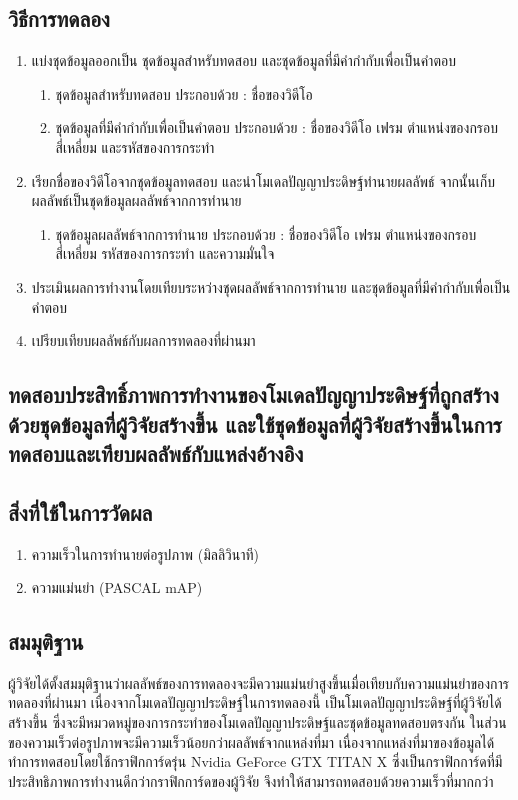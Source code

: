 \subsection*{วิธีการทดลอง}
	\begin{enumerate}
		\item แบ่งชุดข้อมูลออกเป็น ชุดข้อมูลสำหรับทดสอบ และชุดข้อมูลที่มีคำกำกับเพื่อเป็นคำตอบ
			\begin{enumerate}
				\item ชุดข้อมูลสำหรับทดสอบ ประกอบด้วย : ชื่อของวิดีโอ
				\item ชุดข้อมูลที่มีคำกำกับเพื่อเป็นคำตอบ ประกอบด้วย : ชื่อของวิดีโอ เฟรม ตำแหน่งของกรอบสี่เหลี่ยม และรหัสของการกระทำ
			\end{enumerate}
		\item เรียกชื่อของวิดีโอจากชุดข้อมูลทดสอบ และนำโมเดลปัญญาประดิษฐ์ทำนายผลลัพธ์ จากนั้นเก็บผลลัพธ์เป็นชุดข้อมูลผลลัพธ์จากการทำนาย
			\begin{enumerate}
				\item ชุดข้อมูลผลลัพธ์จากการทำนาย ประกอบด้วย : ชื่อของวิดีโอ เฟรม ตำแหน่งของกรอบสี่เหลี่ยม รหัสของการกระทำ และความมั่นใจ
			\end{enumerate}
		\item ประเมินผลการทำงานโดยเทียบระหว่างชุดผลลัพธ์จากการทำนาย และชุดข้อมูลที่มีคำกำกับเพื่อเป็นคำตอบ	
		\item เปรียบเทียบผลลัพธ์กับผลการทดลองที่ผ่านมา
\end{enumerate}
\clearpage
\subsection{ทดสอบประสิทธิ์ภาพการทำงานของโมเดลปัญญาประดิษฐ์ที่ถูกสร้างด้วยชุดข้อมูลที่ผู้วิจัยสร้างขึ้น และใช้ชุดข้อมูลที่ผู้วิจัยสร้างขึ้นในการทดสอบและเทียบผลลัพธ์กับแหล่งอ้างอิง}
\subsection*{สิ่งที่ใช้ในการวัดผล}
	\begin{enumerate}
		\item ความเร็วในการทำนายต่อรูปภาพ (มิลลิวินาที)
		\item ความแม่นยำ (PASCAL mAP)
	\end{enumerate}
\subsection*{สมมุติฐาน}ผู้วิจัยได้ตั้งสมมุติฐานว่าผลลัพธ์ของการทดลองจะมีความแม่นยำสูงขึ้นเมื่อเทียบกับความแม่นยำของการทดลองที่ผ่านมา เนื่องจากโมเดลปัญญาประดิษฐ์ในการทดลองนี้ 
เป็นโมเดลปัญญาประดิษฐ์ที่ผู้วิจัยได้สร้างขึ้น ซึ่งจะมีหมวดหมู่ของการกระทำของโมเดลปัญญาประดิษฐ์และชุดข้อมูลทดสอบตรงกัน ในส่วนของความเร็วต่อรูปภาพจะมีความเร็วน้อยกว่าผลลัพธ์จากแหล่งที่มา 
เนื่องจากแหล่งที่มาของข้อมูลได้ทำการทดสอบโดยใช้กราฟิกการ์ดรุ่น Nvidia GeForce GTX TITAN X ซึ่งเป็นกราฟิกการ์ดที่มีประสิทธิภาพการทำงานดีกว่ากราฟิกการ์ดของผู้วิจัย จึงทำให้สามารถทดสอบด้วยความเร็วที่มากกว่า
